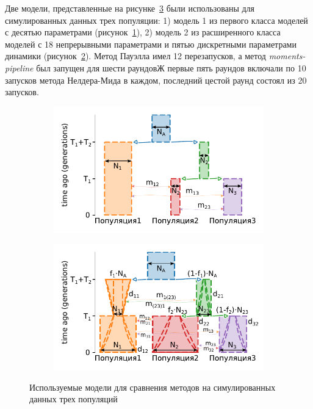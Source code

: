Две модели, представленные на рисунке~\ref{fig:part2:experiments:simulated_3:models} были использованы для симулированных данных трех популяции: 1) модель 1 из первого класса моделей с десятью параметрами (рисунок~\ref{fig:part2:experiments:simulated_3:models_1}), 2) модель 2 из расширенного класса моделей с 18 непрерывными параметрами и пятью дискретными параметрами динамики (рисунок~\ref{fig:part2:experiments:simulated_3:models_2}).
Метод Пауэлла имел 12 перезапусков, а метод \textit{moments-pipeline} был запущен для шести раундовЖ первые пять раундов включали по 10 запусков метода Нелдера-Мида в каждом, последний цестой раунд состоял из 20 запусков.

\begin{figure}[ht]
    \centering
    \begin{subfigure}[b]{.5\textwidth}
    \includegraphics[width=\textwidth]{images_experiments/simulation_1/3pop/picture_1pop_model_1.pdf}
    \caption{}
    \label{fig:part2:experiments:simulated_3:models_1}
    \end{subfigure}%
    \begin{subfigure}[b]{.5\textwidth}
    \includegraphics[width=\textwidth]{images_experiments/simulation_1/3pop/picture_1pop_model_2.pdf}
    \caption{}
    \label{fig:part2:experiments:simulated_3:models_2}
    \end{subfigure}
    \caption{Используемые модели для сравнения методов на симулированных данных трех популяций}
    \label{fig:part2:experiments:simulated_3:models}
\end{figure}

